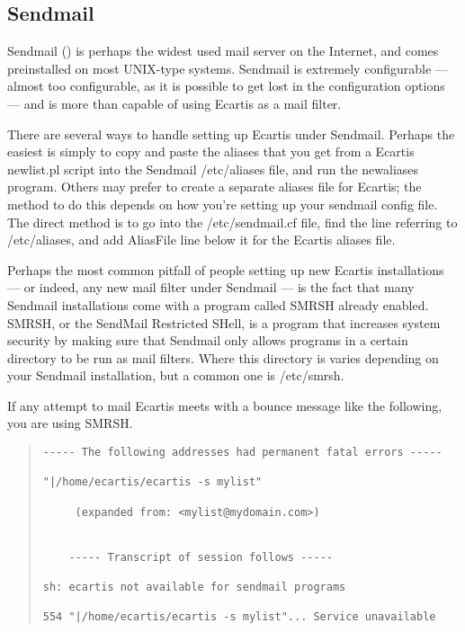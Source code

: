 \documentclass{book}
\begin{document}
\subsection{Sendmail}
\label{starting:filters:sendmail}
   
Sendmail () is perhaps the widest used mail
server on the Internet, and comes preinstalled on most UNIX-type systems.
Sendmail is extremely configurable --- almost too configurable, as it is
possible to get lost in the configuration options --- and is more than capable
of using Ecartis as a mail filter.
   
There are several ways to handle setting up Ecartis under Sendmail.  Perhaps
the easiest is simply to copy and paste the aliases that you get from a Ecartis
newlist.pl script into the Sendmail /etc/aliases file, and run the newaliases
program.  Others may prefer to create a separate aliases file for Ecartis; the
method to do this depends on how you're setting up your sendmail config file.
The direct method is to go into the /etc/sendmail.cf file, find the line
referring to /etc/aliases, and add AliasFile line below it for the Ecartis
aliases file.

Perhaps the most common pitfall of people setting up new Ecartis installations
--- or indeed, any new mail filter under Sendmail --- is the fact that many
Sendmail installations come with a program called SMRSH already enabled.
SMRSH, or the SendMail Restricted SHell, is a program that increases system
security by making sure that Sendmail only allows programs in a certain
directory to be run as mail filters.  Where this directory is varies depending
on your Sendmail installation, but a common one is /etc/smrsh.
   
If any attempt to mail Ecartis meets with a bounce message like the following,
you are using SMRSH.
   
\begin{quote}   
\footnotesize
\begin{verbatim}
----- The following addresses had permanent fatal errors -----

"|/home/ecartis/ecartis -s mylist"

     (expanded from: <mylist@mydomain.com>)


    ----- Transcript of session follows -----

sh: ecartis not available for sendmail programs

554 "|/home/ecartis/ecartis -s mylist"... Service unavailable
\end{verbatim}
\end{quote}
   
\end{document}
